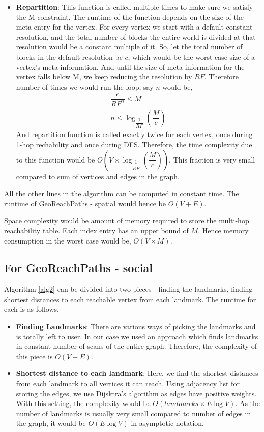 \begin{itemize}
  \item \textbf{Repartition}: This function is called multiple times to make sure we satisfy the M constraint. The runtime of the function depends on the size of the meta entry for the vertex. For every vertex we start with a default constant resolution, and the total number of blocks the entire world is divided at that resolution would be a constant multiple of it. So, let the total number of blocks in the default resolution be $c$, which would be the worst case size of a vertex's meta information. And until the size of meta information for the vertex falls below M, we keep reducing the resolution by $RF$. Therefore number of times we would run the loop, say $n$ would be,
  \begin{eqnarray*}
  	\dfrac{c}{RF^n} \leq M\\
  	n \leq {\log_{\dfrac{1}{RF}} (\dfrac{M}{c})}
  \end{eqnarray*}
  And repartition function is called exactly twice for each vertex, once during 1-hop rechability and once during DFS. Therefore, the time complexity due to this function would be $O(V \times {\log_{\dfrac{1}{RF}} (\dfrac{M}{c})})$. This fraction is very small compared to sum of vertices and edges in the graph.
\end{itemize}

All the other lines in the algorithm can be computed in constant time. The runtime of GeoReachPaths - spatial would hence be $O(V + E)$.

Space complexity would be amount of memory required to store the multi-hop reachability table. Each index entry has an upper bound of $M$. Hence memory consumption in the worst case would be, $O(V \times M)$.

\subsection{For GeoReachPaths - social}
Algorithm \ref{alg2} can be divided into two pieces - finding the landmarks, finding shortest distances to each reachable vertex from each landmark. The runtime for each is as follows,
\begin{itemize}
	\item \textbf{Finding Landmarks}: There are various ways of picking the landmarks and is totally left to user. In our case we used an approach which finds landmarks in constant number of scans of the entire graph. Therefore, the complexity of this piece is $O(V + E)$.
	\item \textbf{Shortest distance to each landmark}: Here, we find the shortest distances from each landmark to all vertices it can reach. Using adjacency list for storing the edges, we use Dijsktra's algorithm as edges have positive weights. With this setting, the complexity would be $O(landmarks \times E\log V)$. As the number of landmarks is usually very small compared to number of edges in the graph, it would be $O(E\log V)$ in asymptotic notation.
\end{itemize}

